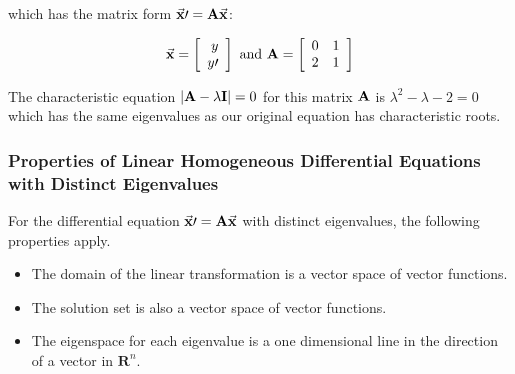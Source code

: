         which has the matrix form $\vec{x}\prime = \ma \vec{x}$:

        \[ \vec{x} = \left[ \begin{array}{r}
            y\\
            y\prime
        \end{array} \right] \text{ and }
        \ma = \left[ \begin{array}{rr}
            0 & 1\\
            2 & 1
        \end{array} \right] \]

    The characteristic equation $| \mathbf{A} - \lambda \mathbf{I} | = 0$ for this matrix $\mathbf{A}$ is $\lambda^2 - \lambda - 2 = 0$ which has the same eigenvalues as our original equation has characteristic roots.

        \subsubsection{Properties of Linear Homogeneous Differential Equations with Distinct Eigenvalues}
        For the differential equation $\vec{x}\prime = \ma\vec{x}$ with distinct eigenvalues, the following properties apply.
            \begin{itemize}
                \item The domain of the linear transformation is a vector space of vector functions.
                \item The solution set is also a vector space of vector functions.
                \item The eigenspace for each eigenvalue is a one dimensional line in the direction of a vector in $\mathbf{R}^n$.
            \end{itemize}

